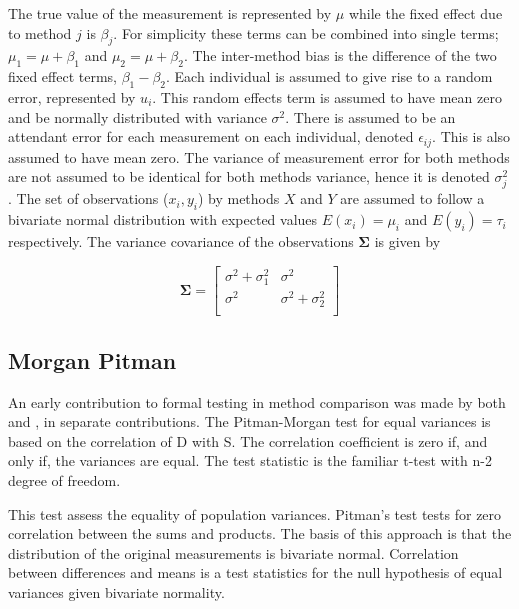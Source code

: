 \documentclass[12pt, a4paper]{report}
\theoremstyle{plain}
\theoremstyle{definition}
\theoremstyle{remark}
\begin{document}
	The true value of the measurement is represented by $\mu$ while the fixed effect due to method $j$ is $\beta_{j}$.
	For simplicity these terms can be combined into single terms; $\mu_{1} = \mu+ \beta_{1}$ and $\mu_{2} = \mu + \beta_{2}$. The inter-method bias is the difference of the two fixed effect terms, $\beta_{1}-\beta_{2}$. Each individual is assumed to give rise to a random error, represented by $u_{i}$. This random effects term is assumed to have mean zero and be normally distributed with variance $\sigma^2$. There is assumed to be an attendant error for each measurement on each individual, denoted $\epsilon_{ij}$. This is also assumed to have mean zero. The variance of measurement error for both methods are not assumed to be identical for both methods variance,  hence it is denoted $\sigma^2_{j}$. The set of observations ($x_{i},y_{i}$) by methods $X$ and $Y$ are assumed to follow a bivariate normal distribution with expected values $E(x_{i})= \mu_{i}$ and $E(y_{i})= \tau_{i}$ respectively. The variance covariance of the observations $\boldsymbol{\Sigma}$ is given by
	
	\[
	\boldsymbol{\Sigma} = \left[
	\begin{array}{cc}
	\sigma^{2} + \sigma^{2}_{1} & \sigma^{2} \\
	\sigma^{2} & \sigma^{2} + \sigma^{2}_{2} \\
	\end{array}
	\right]
	\] 
	

	
	
	
	\subsection{Morgan Pitman}
	
	
	An early contribution to formal testing in method comparison was
	made by both \citet{Morgan} and \citet{Pitman}, in separate
	contributions. The Pitman-Morgan test for equal variances is based on the correlation of D with S. The correlation coefficient is zero if, and only if, the variances are equal. The test statistic is the familiar t-test with n-2 degree of freedom. 
	
	This test assess the equality
	of population variances. Pitman's test tests for zero correlation
	between the sums and products. The basis of this approach is that the
	distribution of the original measurements is bivariate normal.
	Correlation between differences and means is a test statistics for
	the null hypothesis of equal variances given bivariate normality.
	
\end{document}
